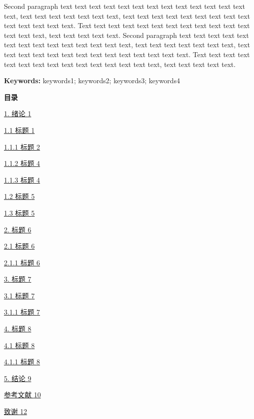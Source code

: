 \documentclass[
]{article}
\begin{document}
Second paragraph text text text text text text text text text text text
text text text, text text text text text text text, text text text text
text text text text text text text text text text. Text text text text
text text text text text text text text text text text, text text text
text text. Second paragraph text text text text text text text text text
text text text text text, text text text text text text text, text text
text text text text text text text text text text text text. Text text
text text text text text text text text text text text text text, text
text text text text.

\textbf{Keywords:} keywords1; keywords2; keywords3; keywords4

\textbf{目录}

\hyperref[_Toc15630]{1. 绪论 \hyperref[_Toc15630]{1}}

\hyperref[_Toc28684]{1.1 标题 \hyperref[_Toc28684]{1}}

\hyperref[_Toc5342]{1.1.1 标题 \hyperref[_Toc5342]{2}}

\hyperref[_Toc26435]{1.1.2 标题 \hyperref[_Toc26435]{4}}

\hyperref[_Toc32459]{1.1.3 标题 \hyperref[_Toc32459]{4}}

\hyperref[_Toc22971]{1.2 标题 \hyperref[_Toc22971]{5}}

\hyperref[_Toc7083]{1.3 标题 \hyperref[_Toc7083]{5}}

\hyperref[_Toc31455]{2. 标题 \hyperref[_Toc31455]{6}}

\hyperref[_Toc4287]{2.1 标题 \hyperref[_Toc4287]{6}}

\hyperref[_Toc12161_WPSOffice_Level3]{2.1.1 标题
\hyperref[_Toc12161_WPSOffice_Level3]{6}}

\hyperref[_Toc18030]{3. 标题 \hyperref[_Toc18030]{7}}

\hyperref[_Toc7093_WPSOffice_Level2]{3.1 标题
\hyperref[_Toc7093_WPSOffice_Level2]{7}}

\hyperref[_Toc7714]{3.1.1 标题 \hyperref[_Toc7714]{7}}

\hyperref[_Toc4937]{4. 标题 \hyperref[_Toc4937]{8}}

\hyperref[_Toc22371]{4.1 标题 \hyperref[_Toc22371]{8}}

\hyperref[_Toc27652]{4.1.1 标题 \hyperref[_Toc27652]{8}}

\hyperref[_Toc4867]{5. 结论 \hyperref[_Toc4867]{9}}

\hyperref[_Toc26992]{参考文献 \hyperref[_Toc26992]{10}}

\hyperref[_Toc9629]{致谢 \hyperref[_Toc9629]{12}}
\end{document}
